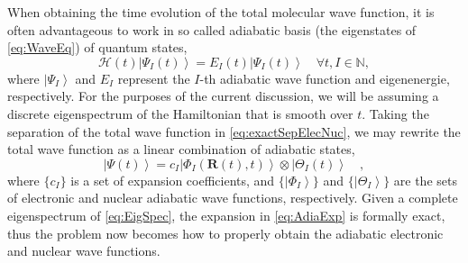 \documentclass[12pt]{article}
\newcommand{\ket}[1]{\left\vert #1 \right\rangle}         %
\newcommand*\vc[1]{\boldsymbol{#1}}
\newcommand*\op[1]{\mathcal{#1}}
\begin{document}
When obtaining the time evolution of the total molecular wave function, it is
often advantageous to work in so called adiabatic basis (the eigenstates of
\cref{eq:WaveEq}) of quantum states,
\begin{equation}
\op{H}(t) \ket{\Psi_I (t)} = E_I(t) \ket{\Psi_I (t)}
\quad \forall t, I \in \mathbb{N},
\label{eq:EigSpec}
\end{equation}
where $\ket{\Psi_I}$ and $E_I$ represent the $I$-th adiabatic wave function and
eigenenergie, respectively. For the purposes of the current discussion, we will
be assuming a discrete eigenspectrum of the Hamiltonian that is smooth over $t$.
Taking the separation of the total wave function in \cref{eq:exactSepElecNuc},
we may rewrite the total wave function as a linear combination of adiabatic
states,
\begin{equation}
\ket{\Psi (t)} = c_I \ket{\Phi_I (\vc{R}(t),t)} \otimes \ket{\Theta_I (t)}
\quad ,
\label{eq:AdiaExp}
\end{equation}
where $\{ c_I \}$ is a set of expansion coefficients, and $\{\ket{\Phi_I}\}$ and
$\{\ket{\Theta_I}\}$ are the sets of electronic and nuclear adiabatic wave
functions, respectively. Given a complete eigenspectrum of \cref{eq:EigSpec},
the expansion in \cref{eq:AdiaExp} is formally exact, thus the problem now
becomes how to properly obtain the adiabatic electronic and nuclear wave
functions.
\end{document}

